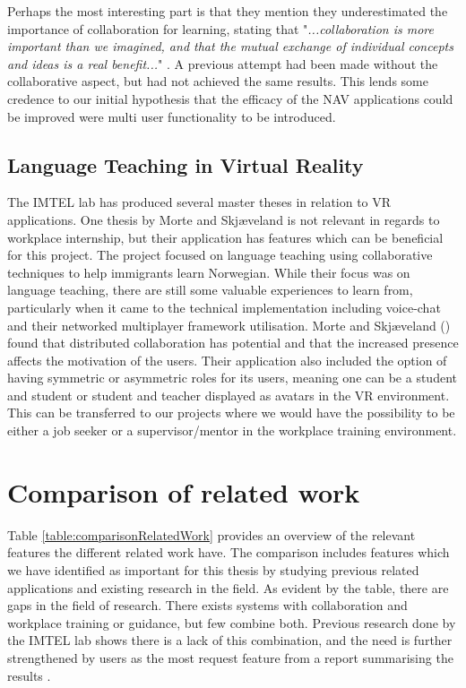 Perhaps the most interesting part is that they mention they underestimated the importance of collaboration for learning, stating that "\textit{...collaboration is more important than we imagined, and that the mutual exchange of individual concepts and ideas is a real benefit...}" \cite{kockro2007collaborative}. A previous attempt had been made without the collaborative aspect, but had not achieved the same results. This lends some credence to our initial hypothesis that the efficacy of the NAV applications could be improved were multi user functionality to be introduced. 

\subsection{Language Teaching in Virtual Reality}
The IMTEL lab has produced several master theses in relation to VR applications. One thesis by  Morte and Skjæveland \cite{morte2019effects} is not relevant in regards to workplace internship, but their application has features which can be beneficial for this project. The project focused on language teaching using collaborative techniques to help immigrants learn Norwegian. While their focus was on language teaching, there are still some valuable experiences to learn from, particularly when it came to the technical implementation including voice-chat and their networked multiplayer framework utilisation. Morte and Skjæveland (\citeyear{morte2019effects}) found that distributed collaboration has potential and that the increased presence affects the motivation of the users. Their application also included the option of having symmetric or asymmetric roles for its users, meaning one can be a student and student or student and teacher displayed as avatars in the VR environment. This can be transferred to our projects where we would have the possibility to be either a job seeker or a supervisor/mentor in the workplace training environment.     

\section{Comparison of related work}
\label{section:comparisonRelatedWork}
Table \ref{table:comparisonRelatedWork} provides an overview of the relevant features the different related work have. The comparison includes features which we have identified as important for this thesis by studying previous related applications and existing research in the field. As evident by the table, there are gaps in the field of research. 
There exists systems with collaboration and workplace training or guidance, but few combine both. Previous research done by the IMTEL lab shows there is a lack of this combination, and the need is further strengthened by users as the most request feature from a report summarising the results \cite{NavVRrapport}.       



